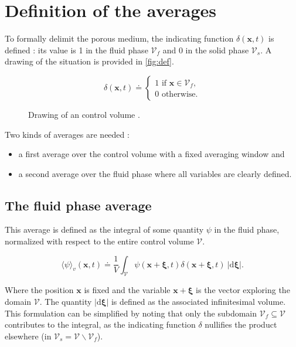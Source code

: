 \documentclass[a4paper,11pt]{article}
\begin{document}
\section{Definition of the averages}

To formally delimit the porous medium, the indicating function ${\delta(\bm x, t)}$ is defined : its value is 1 in the fluid phase $\mathcal V_f$ and 0 in the solid phase $\mathcal V_s$.
A drawing of the situation is provided in \autoref{fig:def}.

$$\delta(\bm x, t) \doteq
\begin{cases}
    1 \text{ if } \bm x \in \mathcal V_f,\\
    0 \text{ otherwise.}
\end{cases}$$

\begin{figure}
  \centering
  
  \caption{Drawing of an control volume \citep{Whitaker1999}.\label{fig:def}}
\end{figure}

Two kinds of averages are needed :

\begin{itemize}
\item
  a first average over the control volume with a fixed averaging window and
\item
  a second average over the fluid phase where all variables are clearly defined.
\end{itemize}

\subsection{The fluid phase average}

This average is defined as the integral of some quantity $\psi$ in the fluid phase, normalized with respect to the entire control volume $\mathcal V$.

$$\langle\psi\rangle_v(\bm x, t) \doteq \frac{1}{V}\int_{\mathcal V} \psi(\bm x+\bm\xi, t) \delta(\bm x + \bm\xi, t) ~\left|\mathrm d\bm \xi\right|.$$

Where the position $\bm x$ is fixed and the variable ${\bm x + \bm\xi}$ is the vector exploring the domain $\mathcal V$.
The quantity ${\left|\mathrm d\bm\xi\right|}$ is defined as the associated infinitesimal volume.
This formulation can be simplified by noting that only the subdomain $\mathcal V_f\subseteq\mathcal V$ contributes to the integral, as the indicating function $\delta$ nullifies the product elsewhere (in ${\mathcal V_s=\mathcal V\backslash\mathcal V_f}$).
\end{document}
